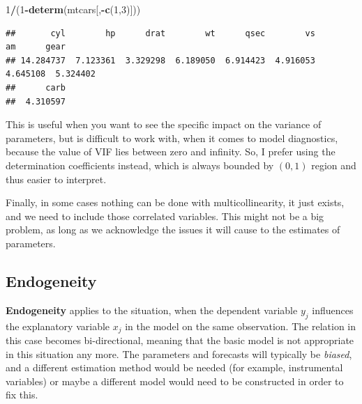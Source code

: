 \documentclass[
]{book}
\newenvironment{Shaded}{\begin{snugshade}}{\end{snugshade}}
\newcommand{\DecValTok}[1]{\textcolor[rgb]{0.00,0.00,0.81}{#1}}
\newcommand{\FunctionTok}[1]{\textcolor[rgb]{0.13,0.29,0.53}{\textbf{#1}}}
\newcommand{\NormalTok}[1]{#1}
\newcommand{\SpecialCharTok}[1]{\textcolor[rgb]{0.81,0.36,0.00}{\textbf{#1}}}
\theoremstyle{definition}
\theoremstyle{definition}
\theoremstyle{definition}
\theoremstyle{definition}
\theoremstyle{remark}
\begin{document}
\begin{Shaded}
\begin{Highlighting}[]
\DecValTok{1}\SpecialCharTok{/}\NormalTok{(}\DecValTok{1}\SpecialCharTok{{-}}\FunctionTok{determ}\NormalTok{(mtcars[,}\SpecialCharTok{{-}}\FunctionTok{c}\NormalTok{(}\DecValTok{1}\NormalTok{,}\DecValTok{3}\NormalTok{)]))}
\end{Highlighting}
\end{Shaded}

\begin{verbatim}
##       cyl        hp      drat        wt      qsec        vs        am      gear 
## 14.284737  7.123361  3.329298  6.189050  6.914423  4.916053  4.645108  5.324402 
##      carb 
##  4.310597
\end{verbatim}

This is useful when you want to see the specific impact on the variance of parameters, but is difficult to work with, when it comes to model diagnostics, because the value of VIF lies between zero and infinity. So, I prefer using the determination coefficients instead, which is always bounded by \((0, 1)\) region and thus easier to interpret.

Finally, in some cases nothing can be done with multicollinearity, it just exists, and we need to include those correlated variables. This might not be a big problem, as long as we acknowledge the issues it will cause to the estimates of parameters.

\subsection{Endogeneity}\label{assumptionsXregEndogeneity}

\textbf{Endogeneity} applies to the situation, when the dependent variable \(y_j\) influences the explanatory variable \(x_j\) in the model on the same observation. The relation in this case becomes bi-directional, meaning that the basic model is not appropriate in this situation any more. The parameters and forecasts will typically be \emph{biased}, and a different estimation method would be needed (for example, instrumental variables) or maybe a different model would need to be constructed in order to fix this.
\end{document}
